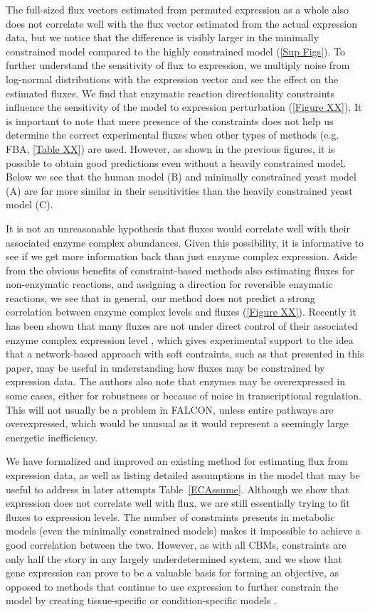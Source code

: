 The full-sized flux vectors estimated from permuted expression as a
whole also does not correlate well with the flux vector estimated from
the actual expression data, but we notice that the difference is
visibly larger in the minimally constrained model compared to the
highly constrained model (\ref{Sup Figs}). To further understand the
sensitivity of flux to expression, we multiply noise from log-normal
distributions with the expression vector and see the effect on the
estimated fluxes. We find that enzymatic reaction directionality
constraints influence the sensitivity of the model to expression
perturbation (\ref{Figure XX}). It is important to note that mere
presence of the constraints does not help us determine the correct
experimental fluxes when other types of methods (e.g. FBA, \ref{Table
  XX}) are used. However, as shown in the previous figures, it is
possible to obtain good predictions even without a heavily constrained
model. Below we see that the human model (B) and minimally constrained
yeast model (A) are far more similar in their sensitivities than the
heavily constrained yeast model (C).

It is not an unreasonable hypothesis that fluxes would correlate well
with their associated enzyme complex abundances. Given this
possibility, it is informative to see if we get more information back
than just enzyme complex expression. Aside from the obvious benefits
of constraint-based methods also estimating fluxes for non-enzymatic
reactions, and assigning a direction for reversible enzymatic
reactions, we see that in general, our method does not predict a
strong correlation between enzyme complex levels and fluxes
(\ref{Figure XX}). Recently it has been shown that many fluxes are not
under direct control of their associated enzyme complex expression
level \citep{Chubukov2013}, which gives experimental support to the
idea that a network-based approach with soft contraints, such as that
presented in this paper, may be useful in understanding how fluxes may
be constrained by expression data. The authors also note that enzymes
may be overexpressed in some cases, either for robustness or because
of noise in transcriptional regulation. This will not usually be a
problem in FALCON, unless entire pathways are overexpressed, which
would be unusual as it would represent a seemingly large energetic
inefficiency.

We have formalized and improved an existing method for estimating flux
from expression data, as well as listing detailed assumptions in the
model that may be useful to address in later attempts
Table~\ref{ECAssume}.  Although we show that expression does not
correlate well with flux, we are still essentially trying to fit
fluxes to expression levels.  The number of constraints presents in
metabolic models (even the minimally constrained models) makes it
impossible to achieve a good correlation between the two. However, as
with all CBMs, constraints are only half the story in any largely
underdetermined system, and we show that gene expression can prove to
be a valuable basis for forming an objective, as opposed to methods
that continue to use expression to further constrain the model by
creating tissue-specific or condition-specific models
\citep{Wang2012,Shlomi2008,Becker2008}.

